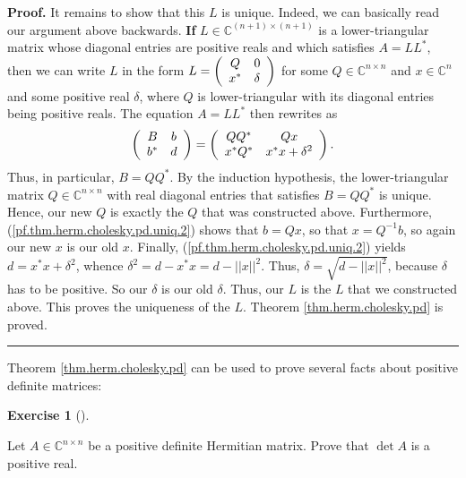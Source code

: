 \documentclass[numbers=enddot,12pt,final,onecolumn,notitlepage]{scrartcl}%
\newcounter{exer}
\numberwithin{exer}{subsection}
\theoremstyle{definition}
\newtheorem{exmp}[exer]{Exercise}
\newenvironment{exercise}[1][]
{\begin{exmp}[#1]\begin{leftbar}}
{\end{leftbar}\end{exmp}}
\newenvironment{proof}[1][Proof]{\noindent\textbf{#1.} }{\ \rule{0.5em}{0.5em}}
\begin{document}
\begin{proof}
It remains to show that this $L$ is unique. Indeed, we can basically read our
argument above backwards. \textbf{If} $L\in\mathbb{C}^{\left(  n+1\right)
\times\left(  n+1\right)  }$ is a lower-triangular matrix whose diagonal
entries are positive reals and which satisfies $A=LL^{\ast}$, then we can
write $L$ in the form $L=\left(
\begin{array}
[c]{cc}%
Q & 0\\
x^{\ast} & \delta
\end{array}
\right)  $ for some $Q\in\mathbb{C}^{n\times n}$ and $x\in\mathbb{C}^{n}$ and
some positive real $\delta$, where $Q$ is lower-triangular with its diagonal
entries being positive reals. The equation $A=LL^{\ast}$ then rewrites as%
\begin{equation}
\left(
\begin{array}
[c]{cc}%
B & b\\
b^{\ast} & d
\end{array}
\right)  =\left(
\begin{array}
[c]{cc}%
QQ^{\ast} & Qx\\
x^{\ast}Q^{\ast} & x^{\ast}x+\delta^{2}%
\end{array}
\right)  .\label{pf.thm.herm.cholesky.pd.uniq.2}%
\end{equation}
Thus, in particular, $B=QQ^{\ast}$. By the induction hypothesis, the
lower-triangular matrix $Q\in\mathbb{C}^{n\times n}$ with real diagonal
entries that satisfies $B=QQ^{\ast}$ is unique. Hence, our new $Q$ is exactly
the $Q$ that was constructed above. Furthermore,
(\ref{pf.thm.herm.cholesky.pd.uniq.2}) shows that $b=Qx$, so that $x=Q^{-1}b$,
so again our new $x$ is our old $x$. Finally,
(\ref{pf.thm.herm.cholesky.pd.uniq.2}) yields $d=x^{\ast}x+\delta^{2}$, whence
$\delta^{2}=d-x^{\ast}x=d-\left\vert \left\vert x\right\vert \right\vert ^{2}%
$. Thus, $\delta=\sqrt{d-\left\vert \left\vert x\right\vert \right\vert ^{2}}%
$, because $\delta$ has to be positive. So our $\delta$ is our old $\delta$.
Thus, our $L$ is the $L$ that we constructed above. This proves the uniqueness
of the $L$. Theorem \ref{thm.herm.cholesky.pd} is proved.
\end{proof}

Theorem \ref{thm.herm.cholesky.pd} can be used to prove several facts about
positive definite matrices:

\begin{exercise}
 Let $A\in\mathbb{C}^{n\times n}$ be a positive definite Hermitian
matrix. Prove that $\det A$ is a positive real.
\end{exercise}
\end{document}
